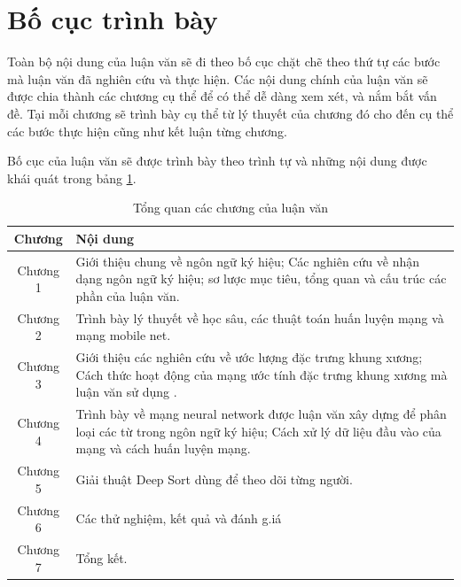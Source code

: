 \section{Bố cục trình bày}
\label{ss:bo_cuc_trinh_bay}

Toàn bộ nội dung của luận văn sẽ đi theo bố cục chặt chẽ theo thứ tự các bước mà luận văn đã nghiên cứu và thực hiện. Các nội dung chính của luận văn sẽ được chia thành các chương cụ thể để có thể dễ dàng xem xét, và nắm bắt vấn đề. Tại mỗi chương sẽ trình bày cụ thể từ lý thuyết của chương đó cho đến cụ thể các bước thực hiện cũng như kết luận từng chương.

Bố cục của luận văn sẽ được trình bày theo trình tự và những nội dung được khái quát trong bảng \ref{table:bo_cuc_luan_van}.

\FloatBarrier
\begin{table}[h]
\caption{Tổng quan các chương của luận văn}
\label{table:bo_cuc_luan_van}
\centering
\begin{center}
\begin{tabular}{|c|p{13cm}|} 
 \hline
Chương  & Nội dung \\
 \hline
 Chương 1 & Giới thiệu chung về ngôn ngữ ký hiệu; Các nghiên cứu về nhận dạng ngôn ngữ ký hiệu; sơ lược mục tiêu, tổng quan và cấu trúc các phần của luận văn.\\
 \hline 
 Chương 2 & Trình bày lý thuyết về học sâu, các thuật toán huấn luyện mạng và mạng mobile net.\\
 \hline 
 Chương 3 & Giới thiệu các nghiên cứu về ước lượng đặc trưng khung xương; Cách thức hoạt động của mạng ước tính đặc trưng khung xương mà luận văn sử dụng .\\
 \hline
 Chương 4 & Trình bày về mạng neural network được luận văn xây dựng để phân loại các từ trong ngôn ngữ ký hiệu; Cách xử lý dữ liệu đầu vào của mạng và cách huấn luyện mạng. \\
 \hline 
 Chương 5 & Giải thuật Deep Sort dùng để theo dõi từng người.\\
 \hline
 Chương 6 & Các thử nghiệm, kết quả và đánh g.iá\\
 \hline
 Chương 7 & Tổng kết.\\
 \hline
 
\end{tabular}
\end{center}
\end{table}
\FloatBarrier

